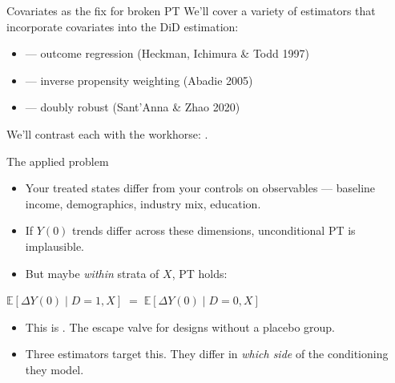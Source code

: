 \documentclass[aspectratio=169,11pt]{beamer}
\begin{document}
\begin{frame}{Covariates as the fix for broken PT}
\vspace{0.5em}
We'll cover a variety of estimators that incorporate covariates into the DiD estimation:
\vspace{0.4em}
\begin{itemize}\setlength\itemsep{0.4em}
  \item {} --- outcome regression (Heckman, Ichimura \& Todd 1997)
  \item {} --- inverse propensity weighting (Abadie 2005)
  \item {} --- doubly robust (Sant'Anna \& Zhao 2020)
\end{itemize}
\vspace{0.5em}
We'll contrast each with the workhorse: .
\vspace{0.3em}
\end{frame}

\begin{frame}{The applied problem}
\vspace{0.5em}
\begin{itemize}
  \item Your treated states differ from your controls on observables --- baseline income, demographics, industry mix, education.
  \item If $Y(0)$ trends differ across these dimensions, unconditional PT is implausible.
  \item But maybe \textit{within} strata of $X$, PT holds:
\end{itemize}
\vspace{0.4em}
\begin{center}
\small
$\mathbb{E}[\Delta Y(0) \mid D=1, X] \;=\; \mathbb{E}[\Delta Y(0) \mid D=0, X]$
\end{center}
\vspace{0.5em}
\begin{itemize}
  \item This is . The escape valve for designs without a placebo group.
  \item Three estimators target this. They differ in \textit{which side} of the conditioning they model.
\end{itemize}
\end{frame}
\end{document}
